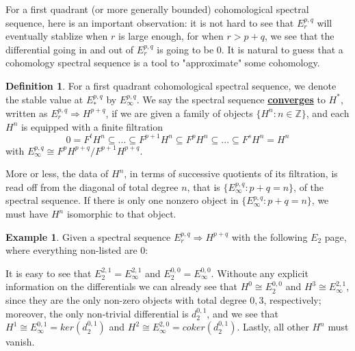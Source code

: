 \documentclass{article}
\theoremstyle{definition}
\theoremstyle{definition}
\theoremstyle{definition}
\theoremstyle{definition}
\newtheorem{definition}{Definition}[theorem]
\theoremstyle{definition}
\theoremstyle{definition}
\newtheorem{example}{Example}[theorem]
\begin{document}
For a first quadrant (or more generally bounded) cohomological spectral sequence, here is an important observation: it is not hard to see that $E_r^{p,q}$ will eventually stablize when $r$ is large enough, for when $r>{p+q}$, we see that the differential going in and out of $E_r^{p,q}$ is going to be $0$. It is natural to guess that a cohomology spectral sequence is a tool to "approximate" some cohomology. 


\begin{tcolorbox}[colback=purple!5!white,colframe=purple!75!black]
\begin{definition}
For a first quadrant cohomological spectral sequence, we denote the stable value at $E_*^{p,q}$ by $E_{\infty}^{p,q}$. We say the spectral sequence \underline{\textbf{converges}} to $H^*$, written as $E_r^{p,q}\Longrightarrow H^{p+q}$, if we are given a family of objects $\{H^n: n\in \mathbb{Z}\}$, and each $H^n$ is equipped with a finite filtration
\[
0=F^tH^n\subseteq ...\subseteq F^{p+1}H^n\subseteq F^pH^n\subseteq ...\subseteq F^sH^n=H^n
\] 
with $E^{p,q}_{\infty}\cong F^pH^{p+q}/F^{p+1}H^{p+q}$. 
\end{definition}
\end{tcolorbox}
More or less, the data of $H^n$, in terms of successive quotients of its filtration, is read off from the diagonal of total degree $n$, that is $\{E_{\infty}^{p,q}: p+q=n\}$, of the spectral sequence. If there is only one nonzero object in $\{E_{\infty}^{p,q}: p+q=n\}$, we must have $H^n$ isomorphic to that object. 


\begin{tcolorbox}[colback=yellow!5!white,colframe=yellow!30!white]
\begin{example}
	Given a spectral sequence $E_r^{p,q}\Longrightarrow H^{p+q}$ with the following $E_2$ page, where everything non-listed are $0$:

	It is easy to see that $E_{2}^{2,1}=E_{\infty}^{2,1}$ and $E_{2}^{0,0}=E_{\infty}^{0,0}$. Withoute any explicit information on the differentials we can already see that $H^0\cong E_{2}^{0,0}$ and $H^3\cong E_{\infty}^{2,1}$, since they are the only non-zero objects with total degree $0,3$, respectively; moreover, the only non-trivial differential is $d_2^{0,1}$, and we see that $H^1\cong E_{\infty}^{0,1}=ker(d_2^{0,1})$ and $H^2\cong E_{\infty}^{2,0}=coker(d_2^{0,1})$. Lastly, all other $H^n$ must vanish. 
	
	
	
\end{example}
\end{tcolorbox}
\end{document}

